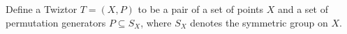 \documentclass{article}
\begin{document}
Define a Twiztor $T = (X, P)$ to be a pair of a set of points $X$ and a set of permutation generators $P\subseteq S_X$, where $S_X$ denotes the symmetric group on $X$.
\end{document}
